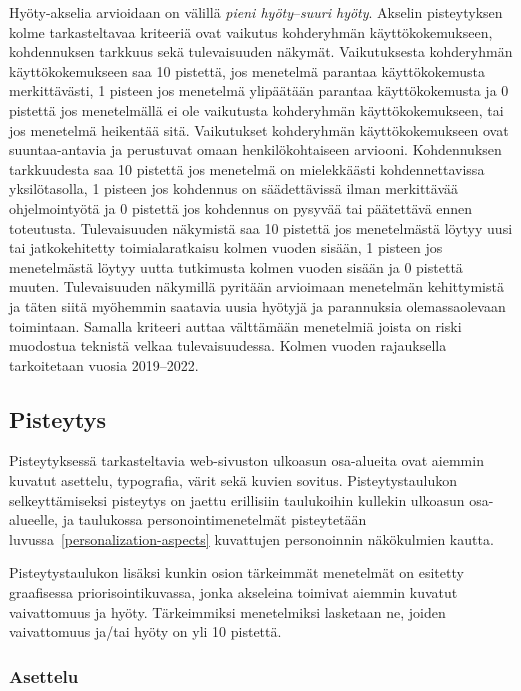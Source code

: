 \documentclass[finnish, 12pt, a4paper, elec, utf8, a-1b, online]{aaltothesis}
\begin{document}
Hyöty-akselia arvioidaan on välillä \textit{pieni hyöty}--\textit{suuri hyöty}.
Akselin pisteytyksen kolme tarkasteltavaa kriteeriä ovat vaikutus kohderyhmän
käyttökokemukseen, kohdennuksen tarkkuus sekä tulevaisuuden näkymät.
Vaikutuksesta kohderyhmän käyttökokemukseen saa 10 pistettä, jos menetelmä
parantaa käyttökokemusta merkittävästi, 1 pisteen jos menetelmä ylipäätään
parantaa käyttökokemusta ja 0 pistettä jos menetelmällä ei ole vaikutusta
kohderyhmän käyttökokemukseen, tai jos menetelmä heikentää sitä. Vaikutukset
kohderyhmän käyttökokemukseen ovat suuntaa-antavia ja perustuvat omaan
henkilökohtaiseen arviooni. Kohdennuksen tarkkuudesta saa 10 pistettä jos
menetelmä on mielekkäästi kohdennettavissa yksilötasolla, 1 pisteen jos
kohdennus on säädettävissä ilman merkittävää ohjelmointyötä ja 0 pistettä jos
kohdennus on pysyvää tai päätettävä ennen toteutusta. Tulevaisuuden näkymistä
saa 10 pistettä jos menetelmästä löytyy uusi tai jatkokehitetty toimialaratkaisu
kolmen vuoden sisään, 1 pisteen jos menetelmästä löytyy uutta tutkimusta kolmen
vuoden sisään ja 0 pistettä muuten. Tulevaisuuden näkymillä pyritään arvioimaan
menetelmän kehittymistä ja täten siitä myöhemmin saatavia uusia hyötyjä ja
parannuksia olemassaolevaan toimintaan. Samalla kriteeri auttaa välttämään
menetelmiä joista on riski muodostua teknistä velkaa tulevaisuudessa. Kolmen
vuoden rajauksella tarkoitetaan vuosia 2019--2022.

\subsection{Pisteytys}

Pisteytyksessä tarkasteltavia web-sivuston ulkoasun osa-alueita ovat aiemmin
kuvatut asettelu, typografia, värit sekä kuvien sovitus.
Pisteytystaulukon selkeyttämiseksi pisteytys on jaettu erillisiin taulukoihin
kullekin ulkoasun osa-alueelle, ja taulukossa personointimenetelmät pisteytetään
luvussa~\ref{personalization-aspects} kuvattujen personoinnin näkökulmien
kautta.

Pisteytystaulukon lisäksi kunkin osion tärkeimmät menetelmät on esitetty
graafisessa priorisointikuvassa, jonka akseleina toimivat aiemmin kuvatut
vaivattomuus ja hyöty. Tärkeimmiksi menetelmiksi lasketaan ne, joiden
vaivattomuus ja/tai hyöty on yli 10 pistettä.

\subsubsection{Asettelu}
\end{document}
